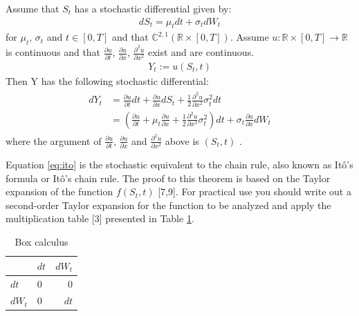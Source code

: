 \documentclass[12pt,oneside]{reedthesis}
\theoremstyle{definition}
\theoremstyle{definition}
\theoremstyle{remark}
\let\BeginKnitrBlock\begin \let\EndKnitrBlock\end
\begin{document}
  \BeginKnitrBlock{lemma}[Itô's Lemma]
  
  \protect\hypertarget{lem:itolemma}{}{\label{lem:itolemma} {} } Assume that \(S_t\) has a stochastic differential given
  by:
  \begin{align}
  dS_t = \mu_t dt + \sigma_t dW_t 
  \end{align}
  \noindent
  for \(\mu_t\), \(\sigma_t\) and \(t \in [0,T]\) and that
  \(\mathbb{C}^{2,1} \left( \mathbb{R} \times \left[0, T \right]\right)\).
  Assume \(u: \mathbb{R} \times [0, T] \rightarrow \mathbb{R}\) is
  continuous and that \(\frac{\partial u}{\partial t}\),
  \(\frac{\partial u}{\partial x}\), \(\frac{\partial^2 u}{\partial x^2}\)
  exist and are continuous.
  \begin{align*}
  Y_t := u(S_t, t)
  \end{align*}
  \noindent
  Then Y has the following stochastic differential:
  \begin{align} 
  \label{eq:ito}
  \begin{split}
      dY_t &= \frac{\partial u}{\partial t}dt + \frac{\partial u}{\partial x} dS_t + \frac{1}{2}\frac{\partial^2 u}{\partial x^2}\sigma_t^2 dt  \\[10pt] 
      &= \left( \frac{\partial u}{\partial t} + \mu_t \frac{\partial u}{\partial x} + \frac{1}{2}\frac{\partial^2 u}{\partial x^2}\sigma_t^2 \right) dt + \sigma_t \frac{\partial u}{\partial x} dW_t
  \end{split}
  \end{align}
  \noindent  where the argument of \(\frac{\partial u}{\partial t}\),
  \(\frac{\partial u}{\partial x}\) and
  \(\frac{\partial^2 u}{\partial x^2}\) above is \(\left( S_t, t \right)\)
  .
  
  \EndKnitrBlock{lemma}
  
  Equation \eqref{eq:ito} is the stochastic equivalent to the chain rule,
  also known as Itô's formula or Itô's chain rule. The proof to this
  theorem is based on the Taylor expansion of the function \(f(S_t, t)\)
  {[}7,9{]}. For practical use you should write out a second-order Taylor
  expansion for the function to be analyzed and apply the multiplication
  table {[}3{]} presented in Table \ref{mat}.
  \begin{table}[ht]
  \centering
  \begin{tabular}{llr}
    \hline 
   & $dt$ & $dW_t$ \\ 
    \hline 
  $dt$ & 0 & 0 \\ 
    $dW_t$ & 0 & $dt$ \\ 
     \hline 
  \end{tabular}
  \caption{Box calculus} 
  \label{mat}
  \end{table}
\end{document}
